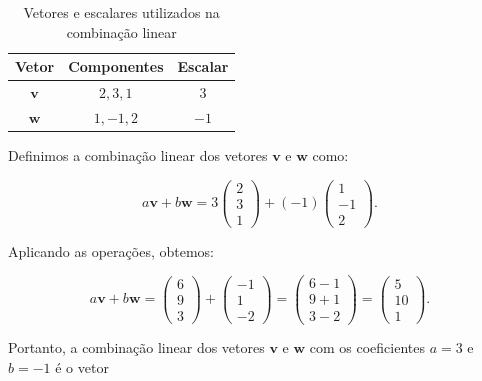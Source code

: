 \begin{table}[h]
	\centering
	\begin{tabular}{@{}ccc@{}}
		\toprule
		\textbf{Vetor} & \textbf{Componentes} & \textbf{Escalar} \\ \midrule
		$\mathbf{v}$   & $ 2, 3, 1$           & $3$              \\
		$\mathbf{w}$   & $ 1, -1, 2$          & $-1$             \\ \bottomrule
	\end{tabular}
	\caption{Vetores e escalares utilizados na combinação linear}
\end{table}

Definimos a combinação linear dos vetores $\mathbf{v}$ e $\mathbf{w}$ como:

\begin{equation}
	a\mathbf{v} + b\mathbf{w} = 3 \begin{pmatrix} 2 \\ 3 \\ 1 \end{pmatrix} + (-1) \begin{pmatrix} 1 \\ -1 \\ 2 \end{pmatrix}.
\end{equation}

Aplicando as operações, obtemos:

\begin{equation}
	a\mathbf{v} + b\mathbf{w} = \begin{pmatrix} 6 \\ 9 \\ 3 \end{pmatrix} + \begin{pmatrix} -1 \\ 1 \\ -2 \end{pmatrix} = \begin{pmatrix} 6 - 1 \\ 9 + 1 \\ 3 - 2 \end{pmatrix} = \begin{pmatrix} 5 \\ 10 \\ 1 \end{pmatrix}.
\end{equation}

Portanto, a combinação linear dos vetores $\mathbf{v}$ e $\mathbf{w}$ com os coeficientes $a = 3$ e $b = -1$ é o vetor

